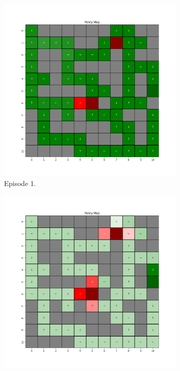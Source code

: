 \documentclass{assignment}
\begin{document}
\begin{figure}[H]
    \begin{subfigure}{0.3\textwidth}
        \includegraphics[width=\textwidth]{figures/policy_td/gamma_sweep/policy_alpha_0.1_gamma_0.1_epsilon_0.2_iteration_1.png}
    \caption{Episode 1.}
    \end{subfigure}\hfill
    \begin{subfigure}{0.3\textwidth}
        \includegraphics[width=\textwidth]{figures/policy_td/gamma_sweep/policy_alpha_0.1_gamma_0.1_epsilon_0.2_iteration_50.png}

\end{subfigure}
\end{figure}
\end{document}
